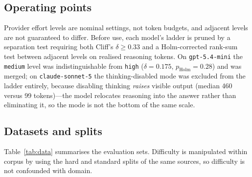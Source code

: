 \documentclass[journal,twoside]{IEEEtran}
\begin{document}
\subsection{Operating points}
Provider effort levels are nominal settings, not token budgets, and adjacent levels are not
guaranteed to differ. Before use, each model's ladder is pruned by a separation test requiring both
Cliff's $\delta \ge 0.33$ and a Holm-corrected rank-sum test between adjacent levels on realised
reasoning tokens. On \texttt{gpt-5.4-mini} the \texttt{medium} level was indistinguishable from
\texttt{high} ($\delta=0.175$, $p_{\mathrm{Holm}}=0.28$) and was merged; on \texttt{claude-sonnet-5}
the thinking-disabled mode was excluded from the ladder entirely, because disabling thinking
\emph{raises} visible output (median 460 versus 99 tokens)---the model relocates reasoning into the
answer rather than eliminating it, so the mode is not the bottom of the same scale.

\subsection{Datasets and splits}
Table~\ref{tab:data} summarises the evaluation sets. Difficulty is manipulated within corpus by
using the hard and standard splits of the same sources, so difficulty is not confounded with domain.

\begin{table}[!htb]
\caption{Evaluation sets. Difficulty is varied within corpus (hard versus standard split of the same
sources) so that difficulty is not confounded with domain. Episodes are the analysed units; items
appear at several operating points and seeds.}
\label{tab:data}
\centering
\small
{}
\end{table}
\end{document}
